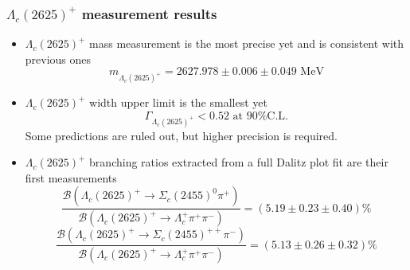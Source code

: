 \documentclass[10pt, aspectratio=169]{beamer}
\def\Lc{{\Lambda_c^+}}
\def\LcII{{\Lambda_c(2625)^+}}
\def\ScIpp{{\Sigma_c(2455)^{++}}{}}
\def\ScIz{{\Sigma_c(2455)^{0}}{}}
\def\pip{{\pi^+}}
\def\pim{{\pi^-}}
\begin{document}
\begin{frame}[label=lc2625-results]%
  \frametitle{$\LcII$ measurement results}
  \begin{itemize}
    \item $\LcII$ mass measurement is the most precise yet
      and is consistent with previous ones
      $$ m_\LcII = 2627.978 \pm 0.006 \pm 0.049 \text{ MeV} $$
    \item $\LcII$ width upper limit is the smallest yet
      $$ \Gamma_\LcII < 0.52 \text{ at 90\% C.L.} $$
      Some predictions are ruled out,
      but higher precision is required.
    \item $\LcII$ branching ratios extracted from
      a full Dalitz plot fit are their first measurements
      $$ \frac{\mathcal{B}\left(\LcII\to\ScIz\pip\right)}
      {\mathcal{B}\left(\LcII\to\Lc\pip\pim\right)}
      = (5.19 \pm 0.23 \pm 0.40)\%$$
      $$ \frac{\mathcal{B}\left(\LcII\to\ScIpp\pim\right)}
      {\mathcal{B}\left(\LcII\to\Lc\pip\pim\right)}
      = (5.13 \pm 0.26 \pm 0.32)\%$$
  \end{itemize}
\end{frame}%
\end{document}
